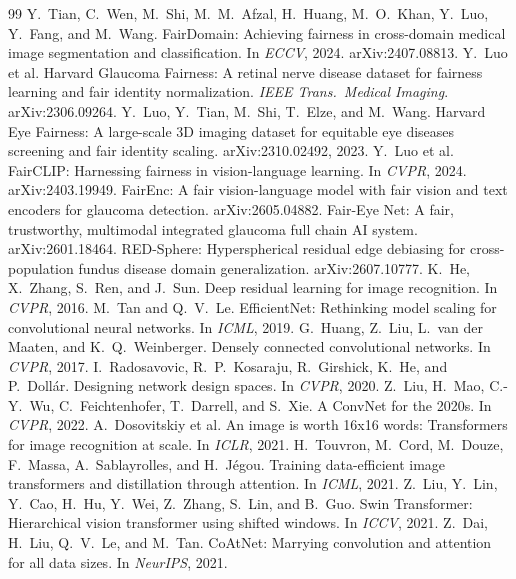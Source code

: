 \documentclass[11pt]{article}
\begin{document}
\begin{thebibliography}{99}\small
{} Y.~Tian, C.~Wen, M.~Shi, M.~M.~Afzal, H.~Huang, M.~O.~Khan, Y.~Luo, Y.~Fang, and M.~Wang. FairDomain: Achieving fairness in cross-domain medical image segmentation and classification. In \emph{ECCV}, 2024. arXiv:2407.08813.
 Y.~Luo et al. Harvard Glaucoma Fairness: A retinal nerve disease dataset for fairness learning and fair identity normalization. \emph{IEEE Trans.\ Medical Imaging}. arXiv:2306.09264.
 Y.~Luo, Y.~Tian, M.~Shi, T.~Elze, and M.~Wang. Harvard Eye Fairness: A large-scale 3D imaging dataset for equitable eye diseases screening and fair identity scaling. arXiv:2310.02492, 2023.
 Y.~Luo et al. FairCLIP: Harnessing fairness in vision-language learning. In \emph{CVPR}, 2024. arXiv:2403.19949.
 FairEnc: A fair vision-language model with fair vision and text encoders for glaucoma detection. arXiv:2605.04882.
 Fair-Eye Net: A fair, trustworthy, multimodal integrated glaucoma full chain AI system. arXiv:2601.18464.
 RED-Sphere: Hyperspherical residual edge debiasing for cross-population fundus disease domain generalization. arXiv:2607.10777.
 K.~He, X.~Zhang, S.~Ren, and J.~Sun. Deep residual learning for image recognition. In \emph{CVPR}, 2016.
 M.~Tan and Q.~V.~Le. EfficientNet: Rethinking model scaling for convolutional neural networks. In \emph{ICML}, 2019.
 G.~Huang, Z.~Liu, L.~van der Maaten, and K.~Q.~Weinberger. Densely connected convolutional networks. In \emph{CVPR}, 2017.
 I.~Radosavovic, R.~P.~Kosaraju, R.~Girshick, K.~He, and P.~Doll\'ar. Designing network design spaces. In \emph{CVPR}, 2020.
 Z.~Liu, H.~Mao, C.-Y.~Wu, C.~Feichtenhofer, T.~Darrell, and S.~Xie. A ConvNet for the 2020s. In \emph{CVPR}, 2022.
 A.~Dosovitskiy et al. An image is worth 16x16 words: Transformers for image recognition at scale. In \emph{ICLR}, 2021.
 H.~Touvron, M.~Cord, M.~Douze, F.~Massa, A.~Sablayrolles, and H.~J\'egou. Training data-efficient image transformers and distillation through attention. In \emph{ICML}, 2021.
 Z.~Liu, Y.~Lin, Y.~Cao, H.~Hu, Y.~Wei, Z.~Zhang, S.~Lin, and B.~Guo. Swin Transformer: Hierarchical vision transformer using shifted windows. In \emph{ICCV}, 2021.
 Z.~Dai, H.~Liu, Q.~V.~Le, and M.~Tan. CoAtNet: Marrying convolution and attention for all data sizes. In \emph{NeurIPS}, 2021.

\end{thebibliography}
\end{document}
